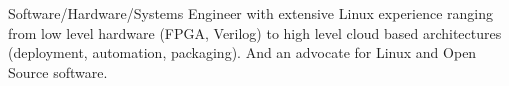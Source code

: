 Software/Hardware/Systems Engineer with extensive Linux experience ranging
from low level hardware (FPGA, Verilog) to high level
cloud based architectures (deployment, automation, packaging).
And an advocate for Linux and Open Source software.
